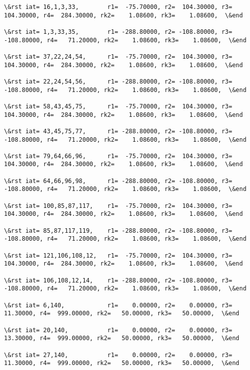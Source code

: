 \documentclass[11pt]{article}
\begin{document}
\begin{Verbatim}[commandchars=\\\{\}]
\&rst iat= 16,1,3,33,        r1=  -75.70000, r2=  104.30000, r3=  104.30000, r4=  284.30000, rk2=    1.08600, rk3=    1.08600,  \&end

\&rst iat= 1,3,33,35,        r1= -288.80000, r2= -108.80000, r3= -108.80000, r4=   71.20000, rk2=    1.08600, rk3=    1.08600,  \&end

\&rst iat= 37,22,24,54,      r1=  -75.70000, r2=  104.30000, r3=  104.30000, r4=  284.30000, rk2=    1.08600, rk3=    1.08600,  \&end

\&rst iat= 22,24,54,56,      r1= -288.80000, r2= -108.80000, r3= -108.80000, r4=   71.20000, rk2=    1.08600, rk3=    1.08600,  \&end

\&rst iat= 58,43,45,75,      r1=  -75.70000, r2=  104.30000, r3=  104.30000, r4=  284.30000, rk2=    1.08600, rk3=    1.08600,  \&end

\&rst iat= 43,45,75,77,      r1= -288.80000, r2= -108.80000, r3= -108.80000, r4=   71.20000, rk2=    1.08600, rk3=    1.08600,  \&end

\&rst iat= 79,64,66,96,      r1=  -75.70000, r2=  104.30000, r3=  104.30000, r4=  284.30000, rk2=    1.08600, rk3=    1.08600,  \&end

\&rst iat= 64,66,96,98,      r1= -288.80000, r2= -108.80000, r3= -108.80000, r4=   71.20000, rk2=    1.08600, rk3=    1.08600,  \&end

\&rst iat= 100,85,87,117,    r1=  -75.70000, r2=  104.30000, r3=  104.30000, r4=  284.30000, rk2=    1.08600, rk3=    1.08600,  \&end

\&rst iat= 85,87,117,119,    r1= -288.80000, r2= -108.80000, r3= -108.80000, r4=   71.20000, rk2=    1.08600, rk3=    1.08600,  \&end

\&rst iat= 121,106,108,12,   r1=  -75.70000, r2=  104.30000, r3=  104.30000, r4=  284.30000, rk2=    1.08600, rk3=    1.08600,  \&end

\&rst iat= 106,108,12,14,    r1= -288.80000, r2= -108.80000, r3= -108.80000, r4=   71.20000, rk2=    1.08600, rk3=    1.08600,  \&end

\&rst iat= 6,140,            r1=    0.00000, r2=    0.00000, r3=   11.30000, r4=  999.00000, rk2=   50.00000, rk3=   50.00000,  \&end

\&rst iat= 20,140,           r1=    0.00000, r2=    0.00000, r3=   13.30000, r4=  999.00000, rk2=   50.00000, rk3=   50.00000,  \&end

\&rst iat= 27,140,           r1=    0.00000, r2=    0.00000, r3=   11.30000, r4=  999.00000, rk2=   50.00000, rk3=   50.00000,  \&end


\end{Verbatim}
\end{document}
